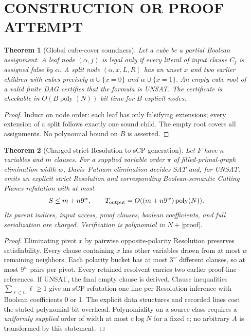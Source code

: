 \documentclass[11pt]{article}
\newtheorem{theorem}{Theorem}
\begin{document}
\section{CONSTRUCTION OR PROOF ATTEMPT}
\begin{theorem}[Global cube-cover soundness]
Let a cube be a partial Boolean assignment. A leaf node $(\alpha,j)$ is legal only if every literal of input clause $C_j$ is assigned false by $\alpha$. A split node $(\alpha,x,L,R)$ has an unset $x$ and two earlier children with cubes precisely $\alpha\cup\{x=0\}$ and $\alpha\cup\{x=1\}$. An empty-cube root of a valid finite DAG certifies that the formula is UNSAT. The certificate is checkable in $O(B\operatorname{poly}(N))$ bit time for $B$ explicit nodes.
\end{theorem}
\begin{proof}
Induct on node order: each leaf has only falsifying extensions; every extension of a split follows exactly one sound child. The empty root covers all assignments. No polynomial bound on $B$ is asserted.
\end{proof}
\begin{theorem}[Charged strict Resolution-to-sCP generation]
Let $F$ have $n$ variables and $m$ clauses. For a supplied variable order $\pi$ of filled-primal-graph elimination width $w$, Davis--Putnam elimination decides SAT and, for UNSAT, emits an explicit strict Resolution and corresponding Boolean-semantic Cutting Planes refutation with at most
\[
S\le m+n9^w,\qquad T_{\rm output}=O((m+n9^w)\operatorname{poly}(N)).
\]
Its parent indices, input access, proof clauses, boolean coefficients, and full serialization are charged. Verification is polynomial in $N+|\mathrm{proof}|$.
\end{theorem}
\begin{proof}
Eliminating pivot $x$ by pairwise opposite-polarity Resolution preserves satisfiability. Every clause containing $x$ has other variables drawn from at most $w$ remaining neighbors. Each polarity bucket has at most $3^w$ different clauses, so at most $9^w$ pairs per pivot. Every retained resolvent carries two earlier proof-line references. If UNSAT, the final empty clause is derived. Clause inequalities $\sum_{\ell\in C}\ell\ge1$ give an sCP refutation one line per Resolution inference with Boolean coefficients 0 or 1. The explicit data structures and recorded lines cost the stated polynomial bit overhead. Polynomiality on a source class requires a \emph{uniformly supplied} order of width at most $c\log N$ for a fixed $c$; no arbitrary $A$ is transformed by this statement.
\end{proof}
\end{document}
